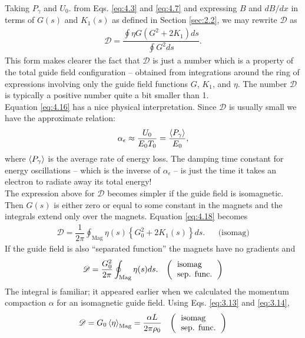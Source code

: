 Taking $P_\gamma$ and $U_0$. from Eqs. \eqref{eq:4.3} and \eqref{eq:4.7} and expressing
 $B$ and $dB/dx$ in terms of $G(s)$ and $K_1(s)$ as defined in Section \ref{sec:2.2}, we may rewrite $\mathscr{D}$ as
\begin{align} \label{eq:4.18}
	\mathscr{D} = \dfrac{\oint \eta G (G^2 + 2K_1)ds}{\oint G^2 ds}.
\end{align}
This form makes clearer the fact that $\mathscr{D}$ is just a number which is a property of
the total guide field configuration -- obtained from integrations around the ring of expressions
 involving only the guide field functions $G$, $K_1$, and $\eta$. The number $\mathscr{D}$ is typically a positive number quite a bit smaller than 1.\\
Equation \eqref{eq:4.16} has a nice physical interpretation. Since $\mathscr{D}$ is usually small
we have the approximate relation:
\begin{align}
	\alpha_\epsilon \approx \dfrac{U_0}{E_0 T_0} = \dfrac{\left< P_\gamma \right>}{E_0},
\end{align}
where $\left< P_\gamma \right>$ is the average rate of energy loss. The damping time constant for energy oscillations -- which is the inverse of $\alpha_\epsilon$ -- is just the time it takes an electron to radiate away its total energy!\\
The expression above for $\mathscr{D}$ becomes simpler if the guide field is isomagnetic. Then $G(s)$ is either zero or equal to some constant in the magnets and the integrals extend only over the magnets. Equation \eqref{eq:4.18} becomes
\begin{align} \label{eq:4.20}
	\mathscr{D} = \dfrac{1}{2\pi}\oint_{\text{Mag}}\eta(s)\left\lbrace G_0^2 + 2K_1(s) \right\rbrace ds. && \text{(isomag)}
\end{align}
If the guide field is also ``separated function'' the magnets have no gradients and
\begin{align}\label{eq:4.17}
	\mathscr{D} = \dfrac{G_0^2}{2\pi}\oint_{\text{Mag}}\eta(s) ds. && \left(\begin{tabular}{l}
\text{isomag} \\
\text{sep. func.}
\end{tabular}\right)
\end{align}
The integral is familiar; it appeared earlier when we calculated the momentum compaction $\alpha$ for an isomagnetic guide field. Using Eqs. \eqref{eq:3.13} and \eqref{eq:3.14},
\begin{align}
	\mathscr{D} = G_0 \mean{\eta}_\text{Mag} = \dfrac{\alpha L}{2 \pi \rho_0} && \left(\begin{tabular}{l}
\text{isomag} \\
\text{sep. func.}
\end{tabular}\right)
\end{align}
